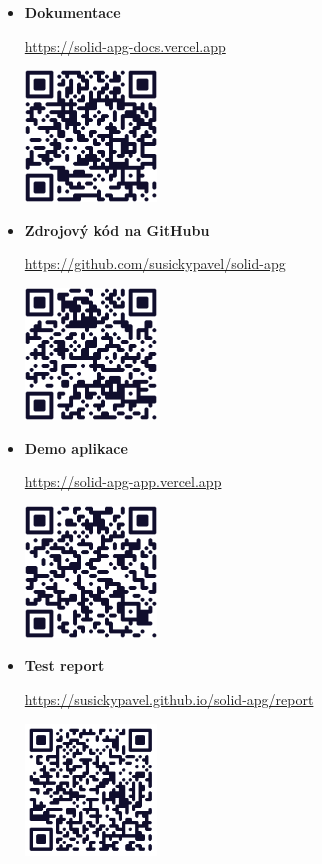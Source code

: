 \begin{itemize}
      \item \textbf{Dokumentace}

            \url{https://solid-apg-docs.vercel.app}

            \includegraphics[width=0.275\textwidth]{assets/figures/qr/docs.png}

      \item \textbf{Zdrojový kód na GitHubu}

            \url{https://github.com/susickypavel/solid-apg}

            \includegraphics[width=0.275\textwidth]{assets/figures/qr/github.png}

      \item \textbf{Demo aplikace}

            \url{https://solid-apg-app.vercel.app}

            \includegraphics[width=0.275\textwidth]{assets/figures/qr/demo.png}

      \item \textbf{Test report}

            \url{https://susickypavel.github.io/solid-apg/report}

            \includegraphics[width=0.275\textwidth]{assets/figures/qr/report.png}


\end{itemize}
